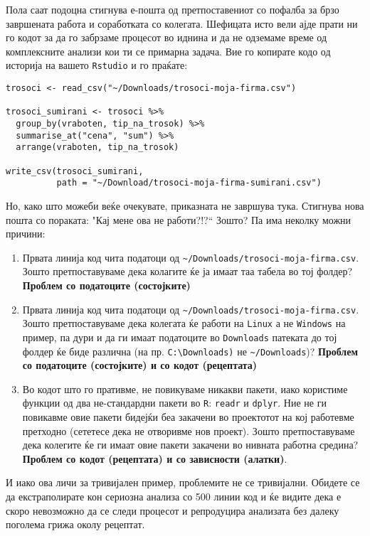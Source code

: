\documentclass[
]{book}
\begin{document}
Пола саат подоцна стигнува е-пошта од претпоставениот со пофалба за брзо завршената работа и соработката со колегата. Шефицата исто вели ајде прати ни го кодот за да го забрзаме процесот во иднина и да не одземаме време од комплексните анализи кои ти се примарна задача. Вие го копирате кодо од историја на вашето \texttt{Rstudio} и го праќате:

\begin{verbatim}
trosoci <- read_csv("~/Downloads/trosoci-moja-firma.csv")

trosoci_sumirani <- trosoci %>% 
  group_by(vraboten, tip_na_trosok) %>% 
  summarise_at("cena", "sum") %>% 
  arrange(vraboten, tip_na_trosok)

write_csv(trosoci_sumirani, 
          path = "~/Download/trosoci-moja-firma-sumirani.csv")
\end{verbatim}

Но, како што можеби веќе очекувате, приказната не завршува тука. Стигнува нова пошта со пораката: "Кај мене ова не работи?!?{}`` Зошто? Па има неколку можни причини:

\begin{enumerate}
\def\labelenumi{\arabic{enumi}.}
\item
  Првата линија код чита податоци од \texttt{\textasciitilde{}/Downloads/trosoci-moja-firma.csv}. Зошто претпоставуваме дека колагите ќе ја имаат таа табела во тој фолдер? \textbf{Проблем со податоците (состојките)}
\item
  Првата линија код чита податоци од \texttt{\textasciitilde{}/Downloads/trosoci-moja-firma.csv}. Зошто претпоставуваме дека колегата ќе работи на \texttt{Linux} а не \texttt{Windows} на пример, па дури и да ги имаат податоците во \texttt{Downloads} патеката до тој фолдер ќе биде различна (на пр. \texttt{C:\textbackslash{}Downloads)} не \texttt{\textasciitilde{}/Downloads})? \textbf{Проблем со податоците (состојките) и со кодот (рецептата)}
\item
  Во кодот што го пративме, не повикуваме никакви пакети, иако користиме функции од два не-стандардни пакети во \texttt{R}: \texttt{readr} и \texttt{dplyr}. Ние не ги повикавме овие пакети бидејќи беа закачени во проектотот на кој работевме претходно (сететесе дека не отворивме нов проект). Зошто претпоставуваме дека колегите ќе ги имаат овие пакети закачени во нивната работна средина? \textbf{Проблем со кодот (рецептата) и со зависности (алатки)}.
\end{enumerate}

И иако ова личи за тривијален пример, проблемите не се тривијални. Обидете се да екстраполирате кон сериозна анализа со 500 линии код и ќе видите дека е скоро невозможно да се следи процесот и репродуцира анализата без далеку поголема грижа околу рецептат.
\end{document}
